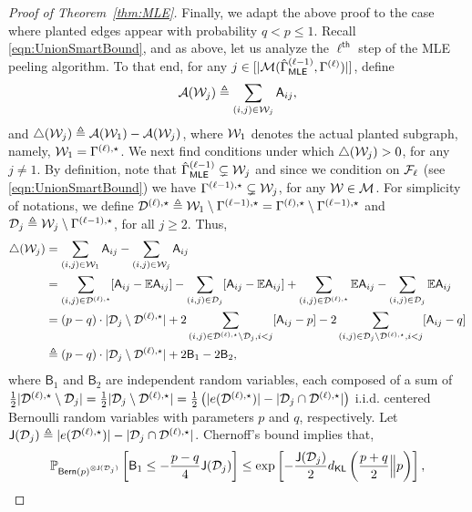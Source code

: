\documentclass[12pt]{article}
\newcommand{\bE}{\mathbb{E}}
\newcommand {\pr} {\mathbb{P}}
\newcommand{\calA}{{\cal A}}
\newcommand{\calD}{{\cal D}}
\newcommand{\calF}{{\cal F}}
\newcommand{\calM}{{\cal M}}
\newcommand{\calW}{{\cal W}}
\newcommand{\p}[1]{\left(#1\right)}
\newcommand{\pp}[1]{\left[#1\right]}
\newcommand{\s}[1]{\mathsf{#1}}
\begin{document}
\begin{proof}[Proof of Theorem~\ref{thm:MLE}]
Finally, we adapt the above proof to the case where planted edges appear with probability $q<p\leq1$. Recall \eqref{eqn:UnionSmartBound}, and as above, let us analyze the $\ell^{\s{th}}$ step of the MLE peeling algorithm. To that end, for any $j\in[|\calM(\hat{\Gamma}^{(\ell-1)}_{\s{MLE}},\Gamma^{(\ell)})|]$, define
\begin{align}
    \calA(\calW_j)\triangleq \sum_{(i,j)\in\calW_j}\s{A}_{ij},
\end{align}
and $\triangle(\calW_j)\triangleq\calA(\calW_1)-\calA(\calW_j)$, where $\calW_1$ denotes the actual planted subgraph, namely, $\calW_1 = \Gamma^{(\ell),\star}$. We next find conditions under which $\triangle(\calW_j)>0$, for any $j\neq 1$. By definition, note that $\hat{\Gamma}^{(\ell-1)}_{\s{MLE}}\subsetneq\calW_j$ and since we condition on $\calF_\ell$ (see \eqref{eqn:UnionSmartBound}) we have $\Gamma^{(\ell-1),\star}\subsetneq\calW_j$, for any $\calW\in\calM$. For simplicity of notations, we define $\calD^{(\ell),\star}\triangleq\calW_1\setminus\Gamma^{(\ell-1),\star}=\Gamma^{(\ell),\star}\setminus\Gamma^{(\ell-1),\star}$ and $\calD_j\triangleq\calW_j\setminus\Gamma^{(\ell-1),\star}$, for all $j\geq2$. Thus,
\begin{align}
    \triangle(\calW_j) &= \sum_{(i,j)\in\calW_1}\s{A}_{ij}-\sum_{(i,j)\in\calW_j}\s{A}_{ij}\\
    & = \sum_{(i,j)\in\calD^{(\ell),\star}}[\s{A}_{ij}-\bE\s{A}_{ij}]-\sum_{(i,j)\in\calD_j}[\s{A}_{ij}-\bE\s{A}_{ij}]+\sum_{(i,j)\in\calD^{(\ell),\star}}\bE\s{A}_{ij}-\sum_{(i,j)\in\calD_j}\bE\s{A}_{ij}\\
    & = (p-q)\cdot |\calD_j\setminus\calD^{(\ell),\star}|+2\sum_{(i,j)\in\calD^{(\ell),\star}\setminus\calD_j,i<j}[\s{A}_{ij}-p]-2\sum_{(i,j)\in\calD_j\setminus\calD^{(\ell),\star},i<j}[\s{A}_{ij}-q]\\
    & \triangleq (p-q)\cdot |\calD_j\setminus\calD^{(\ell),\star}|+2\s{B}_1-2\s{B}_2,
\end{align}
where $\s{B}_1$ and $\s{B}_2$ are independent random variables, each composed of a sum of $\frac{1}{2}|\calD^{(\ell),\star}\setminus\calD_j| = \frac{1}{2}|\calD_j\setminus\calD^{(\ell),\star}| = \frac{1}{2}\p{|e(\calD^{(\ell),\star})|-|\calD_j\cap\calD^{(\ell),\star}|}$ i.i.d. centered Bernoulli random variables with parameters $p$ and $q$, respectively. Let $\s{J}(\calD_j)\triangleq|e(\calD^{(\ell),\star})|-|\calD_j\cap\calD^{(\ell),\star}|$. Chernoff's bound implies that,
\begin{align}
    \pr_{\s{Bern}(p)^{\otimes\s{J}(\calD_j)}}\pp{\s{B}_1\leq-\frac{p-q}{4}\s{J}(\calD_j)}\leq \exp\pp{-\frac{\s{J}(\calD_j)}{2}d_{\s{KL}}\p{\frac{p+q}{2}\Big\| p}},

\end{align}
\end{proof}
\end{document}
